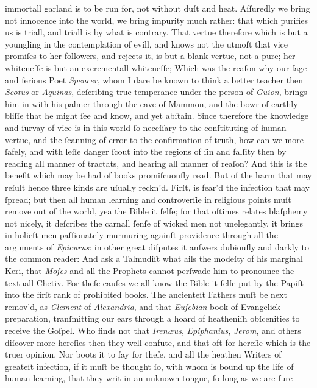 immortall garland is to be run for, not without duſt and heat.  Aſſuredly we
bring not innocence into the world, we bring impurity much rather: that which
purifies us is triall, and triall is by what is contrary.  That vertue therefore
which is but a youngling in the contemplation of evill, and knows not the utmoſt
that vice promiſes to her followers, and rejects it, is but a blank vertue, not
a pure; her whiteneſſe is but an excrementall whiteneſſe; Which was the reaſon
why our ſage and ſerious Poet \textit{Spencer}, whom I dare be known to think a
better teacher then \textit{Scotus} or \textit{Aquinas}, deſcribing true
temperance under the person of \textit{Guion}, brings him in with his palmer
through the cave of Mammon, and the bowr of earthly bliſſe that he might ſee and
know, and yet abſtain.  Since therefore the knowledge and ſurvay of vice is in
this world ſo neceſſary to the conſtituting of human vertue, and the ſcanning of
error to the confirmation of truth, how can we more ſafely, and with leſſe
danger ſcout into the regions of ſin and falſity then by reading all manner of
tractats, and hearing all manner of reaſon?  And this is the benefit which may
be had of books promiſcuouſly read.  But of the harm that may reſult hence three
kinds are uſually reckn'd.  Firſt, is fear'd the infection that may ſpread; but
then all human learning and controverſie in religious points muſt remove out of
the world, yea the Bible it ſelfe; for that oftimes relates blaſphemy not
nicely, it deſcribes the carnall ſenſe of wicked men not unelegantly, it brings
in holieſt men paſſionately murmuring againſt providence through all the
arguments of \textit{Epicurus}: in other great diſputes it anſwers dubiouſly and
darkly to the common reader: And ask a Talmudiſt what ails the modeſty of his
marginal Keri, that \textit{Moſes} and all the Prophets cannot perſwade him to
pronounce the textuall Chetiv.  For theſe cauſes we all know the Bible it ſelfe
put by the Papiſt into the firſt rank of prohibited books.  The ancienteſt
Fathers muſt be next remov'd, as \textit{Clement} of \textit{Alexandria}, and
that \textit{Euſebian} book of Evangelick preparation, tranſmitting our ears
through a hoard of heatheniſh obſcenities to receive the Goſpel.  Who finds not
that \textit{Irenæus}, \textit{Epiphanius}, \textit{Jerom}, and others diſcover
more hereſies then they well confute, and that oft for hereſie which is the
truer opinion.  Nor boots it to ſay for theſe, and all the heathen Writers of
greateſt infection, if it muſt be thought ſo, with whom is bound up the life of
human learning, that they writ in an unknown tongue, ſo long as we are ſure
